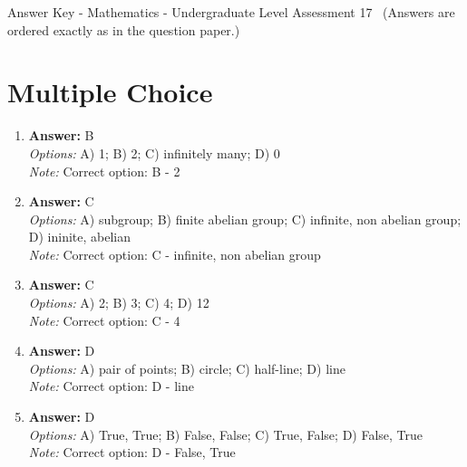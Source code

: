 \documentclass[12pt]{article}
\begin{document}
\begin{center}
Answer Key - Mathematics - Undergraduate Level Assessment 17 \
\small (Answers are ordered exactly as in the question paper.)
\end{center}

\section*{Multiple Choice}
\begin{enumerate}[label=\arabic*.]
\item \textbf{Answer:} B
\\ \textit{Options:} A) 1; B) 2; C) infinitely many; D) 0
\\ \textit{Note:} Correct option: B - 2
\item \textbf{Answer:} C
\\ \textit{Options:} A) subgroup; B) finite abelian group; C) infinite, non abelian group; D) ininite, abelian
\\ \textit{Note:} Correct option: C - infinite, non abelian group
\item \textbf{Answer:} C
\\ \textit{Options:} A) 2; B) 3; C) 4; D) 12
\\ \textit{Note:} Correct option: C - 4
\item \textbf{Answer:} D
\\ \textit{Options:} A) pair of points; B) circle; C) half-line; D) line
\\ \textit{Note:} Correct option: D - line
\item \textbf{Answer:} D
\\ \textit{Options:} A) True, True; B) False, False; C) True, False; D) False, True
\\ \textit{Note:} Correct option: D - False, True
\end{enumerate}
\end{document}
